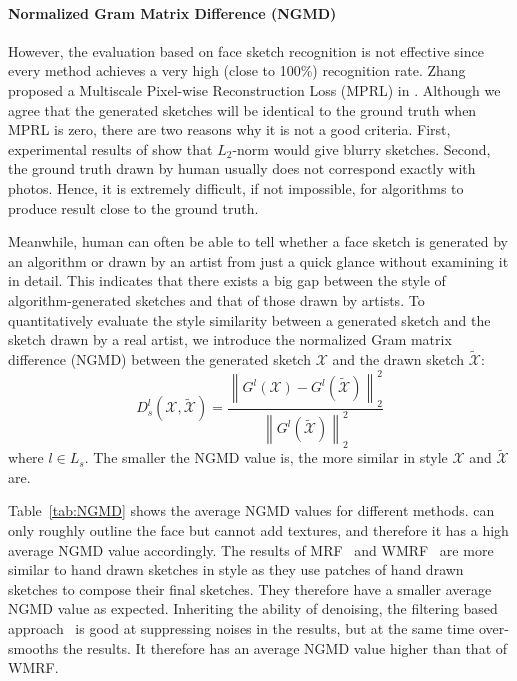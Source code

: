 \documentclass[10pt,twocolumn,letterpaper]{article}
\begin{document}
\paragraph*{Normalized Gram Matrix Difference (NGMD)} 
However, the evaluation based on face sketch recognition is not effective since every method achieves a very high (close to 100\%) recognition rate. %
Zhang \etal proposed a  Multiscale Pixel-wise Reconstruction Loss (MPRL) in \cite{zhang2015end}. Although we agree that the generated sketches will be identical to the ground truth when MPRL is zero, there are two reasons why it is not a good criteria. First, experimental results of \cite{zhang2015end, zhang2017content} show that $L_2$-norm would give blurry sketches. Second, the ground truth drawn by human usually does not correspond exactly with photos. Hence, it is extremely difficult, if not impossible, for algorithms to produce result close to the ground truth.

Meanwhile, human can often be able to tell whether a face sketch is generated by an algorithm or drawn by an artist from just a quick glance without examining it in detail.
This indicates that there exists a big gap between the style of algorithm-generated sketches and that of those drawn by artists. %
To quantitatively evaluate the style similarity between a generated sketch and the sketch drawn by a real artist, we introduce the normalized Gram matrix difference (NGMD) between the generated sketch $\mathcal{X}$ and the drawn sketch ${\tilde {\mathcal{X}}}$:
\begin{equation}
{D^l_s}\left( {\mathcal{X},\tilde {\mathcal{X}}} \right) = \frac{{\left\| {{G^l}\left( \mathcal{X} \right) - {G^l}\left( {\tilde {\mathcal{X}}} \right)} \right\|_2^2}}{{\left\| {{G^l}\left( {\tilde {\mathcal{X}}} \right)} \right\|_2^2}}
\label{eq:style_exp}
\end{equation}
where $l\in L_s$. The smaller the NGMD value is, the more similar in style $\mathcal{X}$ and ${\tilde {\mathcal{X}}}$ are. 

Table~\ref{tab:NGMD} shows the average NGMD values for different methods. \cite{zhang2015end} can only roughly outline the face but cannot add textures, and therefore it has a high average NGMD value accordingly. The results of MRF~\cite{wang2009face} and WMRF~\cite{zhou2012markov} are more similar to hand drawn sketches in style as they use patches of hand drawn sketches to compose their final sketches. They therefore have a smaller average NGMD value as expected. Inheriting the ability of denoising, the filtering based approach~\cite{song2014real} is good at suppressing noises in the results, but at the same time over-smooths the results. It therefore has an average NGMD value higher than that of WMRF.
\end{document}
